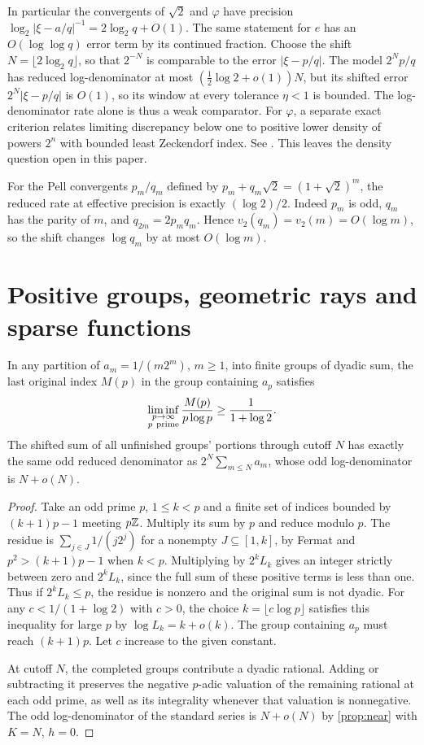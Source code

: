 \documentclass[11pt]{article}
\begin{document}
In particular the convergents of $\sqrt2$ and $\varphi$ have precision $\log_2|\xi-a/q|^{-1}=2\log_2 q+O(1)$. The same statement for $e$ has an $O(\log\log q)$ error term by its continued fraction. Choose the shift $N=\lfloor2\log_2q\rfloor$, so that $2^{-N}$ is comparable to the error $|\xi-p/q|$. The model $2^Np/q$ has reduced log-denominator at most $(\tfrac12\log2+o(1))N$, but its shifted error $2^N|\xi-p/q|$ is $O(1)$, so its window at every tolerance $\eta<1$ is bounded. The log-denominator rate alone is thus a weak comparator. For $\varphi$, a separate exact criterion relates limiting discrepancy below one to positive lower density of powers $2^n$ with bounded least Zeckendorf index. See . This leaves the density question open in this paper.

For the Pell convergents $p_m/q_m$ defined by $p_m+q_m\sqrt2=(1+\sqrt2)^m$, the reduced rate at effective precision is exactly $(\log 2)/2$. Indeed $p_m$ is odd, $q_m$ has the parity of $m$, and $q_{2m}=2p_mq_m$. Hence $v_2(q_m)=v_2(m)=O(\log m)$, so the shift changes $\log q_m$ by at most $O(\log m)$.

\section{Positive groups, geometric rays and sparse functions}\label{sec:groups}

\begin{theorem}\label{th:delay}
In any partition of $a_m=1/(m2^m)$, $m\ge1$, into finite groups of dyadic sum, the last original index $M(p)$ in the group containing $a_p$ satisfies
\[
  \liminf_{\substack{p\to\infty\\p\ {\rm prime}}}
            \frac{M(p)}{p\log p}\ge\frac1{1+\log2}.
\]
The shifted sum of all unfinished groups' portions through cutoff $N$ has exactly the same odd reduced denominator as $2^N\sum_{m\le N}a_m$, whose odd log-denominator is $N+o(N)$.
\end{theorem}
\begin{proof}
Take an odd prime $p$, $1\le k<p$ and a finite set of indices bounded by $(k+1)p-1$ meeting $p\mathbb Z$. Multiply its sum by $p$ and reduce modulo $p$. The residue is $\sum_{j\in J}1/(j2^j)$ for a nonempty $J\subseteq[1,k]$, by Fermat and $p^2>(k+1)p-1$ when $k<p$. Multiplying by $2^k L_k$ gives an integer strictly between zero and $2^k L_k$, since the full sum of these positive terms is less than one. Thus if $2^k L_k\le p$, the residue is nonzero and the original sum is not dyadic. For any $c<1/(1+\log2)$ with $c>0$, the choice $k=\lfloor c\log p\rfloor$ satisfies this inequality for large $p$ by $\log L_k=k+o(k)$. The group containing $a_p$ must reach $(k+1)p$. Let $c$ increase to the given constant.

At cutoff $N$, the completed groups contribute a dyadic rational. Adding or subtracting it preserves the negative $p$-adic valuation of the remaining rational at each odd prime, as well as its integrality whenever that valuation is nonnegative. The odd log-denominator of the standard series is $N+o(N)$ by \cref{prop:near} with $K=N$, $h=0$.
\end{proof}
\end{document}
